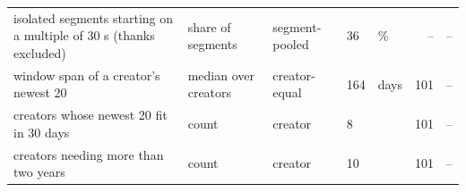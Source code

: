 {\begin{tabular}{@{}p{}p{}p{}lp{}rr@{}}
isolated segments starting on a multiple of 30 s (thanks excluded) & share of segments & segment-pooled & 36 & \% & -- & -- \\
window span of a creator's newest 20 & median over creators & creator-equal & 164 & days & 101 & -- \\
creators whose newest 20 fit in 30 days & count & creator & 8 &  & 101 & -- \\
creators needing more than two years & count & creator & 10 &  & 101 & -- \\
\bottomrule
\end{tabular}}
